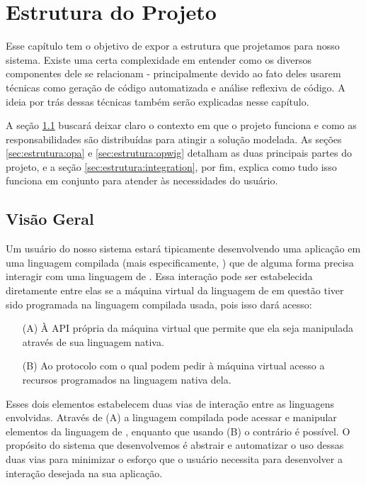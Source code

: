 \chapter{Estrutura do Projeto}
\label{sec:estrutura}

  Esse capítulo tem o objetivo de expor a estrutura que projetamos para nosso
  sistema. Existe uma certa complexidade em entender como os diversos
  componentes dele se relacionam - principalmente devido ao fato deles usarem
  técnicas como geração de código automatizada e análise reflexiva de código. A
  ideia por trás dessas técnicas também serão explicadas nesse capítulo.
  
  A seção \ref{sec:estrutura:geral} buscará deixar
  claro o contexto em que o projeto funciona e como as responsabilidades
  são distribuídas para atingir a solução modelada. As seções
  \ref{sec:estrutura:opa} e \ref{sec:estrutura:opwig} detalham as duas
  principais partes do projeto, e a seção \ref{sec:estrutura:integration}, por
  fim, explica como tudo isso funciona em conjunto para atender às necessidades
  do usuário.

  \section{Visão Geral}
  \label{sec:estrutura:geral}
  
    Um usuário do nosso sistema estará tipicamente desenvolvendo uma aplicação
    em uma linguagem compilada (mais especificamente, \CXX{}) que de alguma
    forma precisa interagir com uma linguagem de \script{}. Essa interação pode
    ser estabelecida diretamente entre elas se a máquina virtual da linguagem de
    \script{} em questão tiver sido programada na linguagem compilada usada,
    pois isso dará acesso:
    
    \begin{itemize}
      \item[(A)]
        À API própria da máquina virtual que permite que ela seja manipulada
        através de sua linguagem nativa.
      \item[(B)]
        Ao protocolo com o qual  podem pedir à máquina virtual acesso
        a recursos programados na linguagem nativa dela.
    \end{itemize}

    Esses dois elementos estabelecem duas vias de interação entre as linguagens
    envolvidas. Através de (A) a linguagem compilada pode acessar e manipular
    elementos da linguagem de \script{}, enquanto que usando (B) o contrário é
    possível. O propósito do sistema que desenvolvemos é abstrair e automatizar
    o uso dessas duas vias para minimizar o esforço que o usuário necessita para
    desenvolver a interação desejada na sua aplicação.


